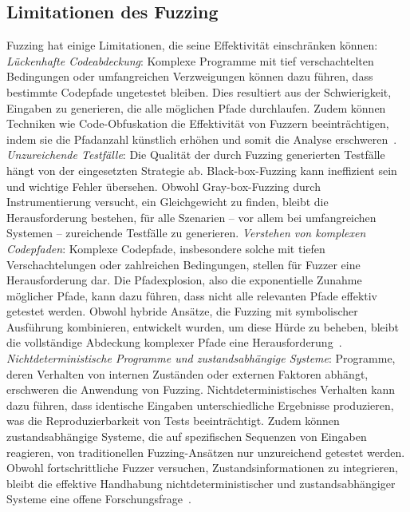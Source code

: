 \subsection{Limitationen des Fuzzing}\label{subsec:limitationen-des-fuzzign}
Fuzzing hat einige Limitationen, die seine Effektivität einschränken können:\newline
\textit{Lückenhafte Codeabdeckung}:
Komplexe Programme mit tief verschachtelten Bedingungen oder umfangreichen Verzweigungen können dazu führen, dass bestimmte
Codepfade ungetestet bleiben.
Dies resultiert aus der Schwierigkeit, Eingaben zu generieren, die alle möglichen Pfade durchlaufen.
Zudem können Techniken wie Code-Obfuskation die Effektivität von Fuzzern beeinträchtigen, indem sie die Pfadanzahl
künstlich erhöhen und somit die Analyse erschweren~\cite{wachter_fuzzing}.\newline
\textit{Unzureichende Testfälle}:
Die Qualität der durch Fuzzing generierten Testfälle hängt von der eingesetzten Strategie ab.
Black-box-Fuzzing kann ineffizient sein und wichtige Fehler übersehen.
Obwohl Gray-box-Fuzzing durch Instrumentierung versucht, ein Gleichgewicht zu finden, bleibt die Herausforderung
bestehen, für alle Szenarien -- vor allem bei umfangreichen Systemen -- zureichende Testfälle zu generieren.\newline
\textit{Verstehen von komplexen Codepfaden}:
Komplexe Codepfade, insbesondere solche mit tiefen Verschachtelungen oder zahlreichen Bedingungen, stellen für Fuzzer eine
Herausforderung dar.
Die Pfadexplosion, also die exponentielle Zunahme möglicher Pfade, kann dazu führen, dass nicht alle relevanten Pfade
effektiv getestet werden.
Obwohl hybride Ansätze, die Fuzzing mit symbolischer Ausführung kombinieren, entwickelt wurden, um diese Hürde zu beheben,
bleibt die vollständige Abdeckung komplexer Pfade eine Herausforderung~\cite{noller_badger_2018}.\newline
\textit{Nichtdeterministische Programme und zustandsabhängige Systeme}:
Programme, deren Verhalten von internen Zuständen oder externen Faktoren abhängt, erschweren die Anwendung von Fuzzing.
Nichtdeterministisches Verhalten kann dazu führen, dass identische Eingaben unterschiedliche Ergebnisse produzieren, was
die Reproduzierbarkeit von Tests beeinträchtigt.
Zudem können zustandsabhängige Systeme, die auf spezifischen Sequenzen von Eingaben reagieren, von traditionellen
Fuzzing-Ansätzen nur unzureichend getestet werden.
Obwohl fortschrittliche Fuzzer versuchen, Zustandsinformationen zu integrieren, bleibt die effektive Handhabung
nichtdeterministischer und zustandsabhängiger Systeme eine offene Forschungsfrage~\cite{she_fox_2024,pham_aflnet_2020}.


